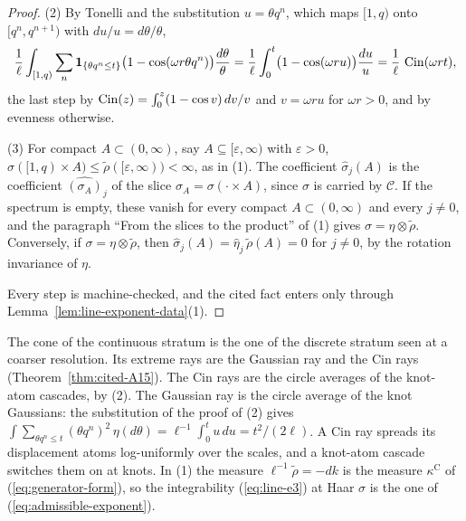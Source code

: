 \begin{proof}
(2) By Tonelli and the substitution $u = \theta q^n$, which maps $[1,q)$ onto $[q^n,q^{n+1})$ with
$du/u = d\theta/\theta$,
\[
  \frac1\ell\int_{[1,q)}\sum_n\mathbf 1_{\{\theta q^n \le t\}}\bigl(1 - \cos(\omega r\theta q^n)\bigr)
  \frac{d\theta}{\theta}
  = \frac1\ell\int_0^t\bigl(1 - \cos(\omega ru)\bigr)\frac{du}{u} = \frac1\ell\,\operatorname{Cin}(\omega rt),
\]
the last step by $\operatorname{Cin}(z) = \int_0^z(1 - \cos v)\,dv/v$ and $v = \omega ru$ for $\omega r > 0$, and
by evenness otherwise.

(3) For compact $A \subset (0,\infty)$, say $A \subseteq [\varepsilon,\infty)$ with
$\varepsilon > 0$, $\sigma([1,q) \times A) \le \tilde\rho([\varepsilon,\infty)) < \infty$, as in (1).
The coefficient $\widehat\sigma_j(A)$ is the coefficient $\widehat{(\sigma_A)}_j$ of the slice
$\sigma_A = \sigma(\cdot \times A)$, since $\sigma$ is carried by $\mathcal{C}$. If the spectrum is
empty, these vanish for every compact $A \subset (0,\infty)$ and every $j \ne 0$, and the paragraph
``From the slices to the product'' of (1) gives $\sigma = \eta \otimes \tilde\rho$. Conversely, if
$\sigma = \eta \otimes \tilde\rho$, then $\widehat\sigma_j(A) = \widehat\eta_j\,\tilde\rho(A) = 0$
for $j \ne 0$, by the rotation invariance of $\eta$.

Every step is machine-checked, and the cited fact enters only through
Lemma~\ref{lem:line-exponent-data}(1).
\end{proof}

The cone of the continuous stratum is the one of the discrete stratum seen at a coarser resolution.
Its extreme rays are the Gaussian ray and the Cin rays 
(Theorem~\ref{thm:cited-A15}).
The Cin rays are the circle averages of the knot-atom cascades, by (2). The Gaussian ray is the
circle average of the knot Gaussians: the substitution of the proof of (2) gives
$\int\sum_{\theta q^n \le t}(\theta q^n)^2\,\eta(d\theta) = \ell^{-1}\int_0^tu\,du = t^2/(2\ell)$.
A Cin ray spreads its displacement atoms log-uniformly over the scales, and a knot-atom cascade
switches them on at knots. In (1) the measure $\ell^{-1}\tilde\rho = -dk$ is the measure
$\kappa^{\mathrm C}$ of (\ref{eq:generator-form}), so the integrability (\ref{eq:line-e3}) at Haar $\sigma$ is
the one of (\ref{eq:admissible-exponent}).

